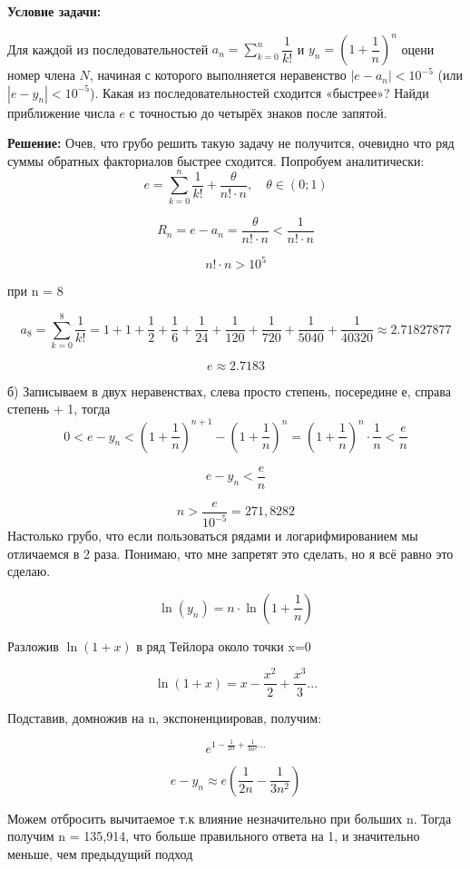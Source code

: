 \documentclass[a4paper,12pt]{article}
\begin{document}
\textbf{Условие задачи:}

Для каждой из последовательностей \( a_n = \sum\limits_{k=0}^{n} \dfrac{1}{k!} \) и \( y_n = \left( 1 + \dfrac{1}{n} \right)^n \) оцени номер члена \( N \), начиная с которого выполняется неравенство \( |e - a_n| < 10^{-5} \) (или \( |e - y_n| < 10^{-5} \)). Какая из последовательностей сходится «быстрее»? Найди приближение числа \( e \) с точностью до четырёх знаков после запятой.

\textbf{Решение: }
Очев, что грубо решить такую задачу не получится, очевидно что ряд суммы обратных факториалов быстрее сходится. Попробуем аналитически:
\[
e = \sum\limits_{k=0}^{n} \dfrac{1}{k!} + \dfrac{\theta}{n! \cdot n}, \quad \theta \in (0;1)
\]

\[
R_n = e - a_n = \dfrac{\theta}{n! \cdot n} < \dfrac{1}{n! \cdot n}
\]

\[
n! \cdot n > 10^{5}
\]

при n = 8

\[
a_8 = \sum\limits_{k=0}^{8} \dfrac{1}{k!} = 1 + 1 + \dfrac{1}{2} + \dfrac{1}{6} + \dfrac{1}{24} + \dfrac{1}{120} + \dfrac{1}{720} + \dfrac{1}{5040} + \dfrac{1}{40320} \approx 2.71827877
\]

\[
e \approx 2.7183
\]

б)
Записываем в двух неравенствах, слева просто степень, посередине е, справа степень + 1, тогда
\[
0 < e - y_n < \left(1 + \dfrac{1}{n}\right)^{n+1} - \left(1 + \dfrac{1}{n}\right)^n = \left(1 + \dfrac{1}{n}\right)^n \cdot \dfrac{1}{n} < \dfrac{e}{n}
\]

\[
e - y_n < \dfrac{e}{n}
\]

\[
n > \frac{e}{10^{-5}} = 271,8282
\]
Настолько грубо, что если пользоваться рядами и логарифмированием мы отличаемся в 2 раза. Понимаю, что мне запретят это сделать, но я всё равно это сделаю.

\[
\ln(y_n) = n \cdot \ln(1+\frac{1}{n})
\]

Разложив $\ln(1+x)$ в ряд Тейлора около точки x=0

\[
\ln(1+x) = x - \frac{x^2}{2}+\frac{x^3}{3}...
\]

Подставив, домножив на n, экспоненциировав, получим:

\[
e^{1-\frac{1}{2n}+\frac{1}{3n^2}...}
\]

\[
e-y_n \approx e(\frac{1}{2n}-\frac{1}{3n^2})
\]

Можем отбросить вычитаемое т.к влияние незначительно при больших n. Тогда получим n = 135,914, что больше правильного ответа на 1, и значительно меньше, чем предыдущий подход
\vspace{1cm}
\end{document}
